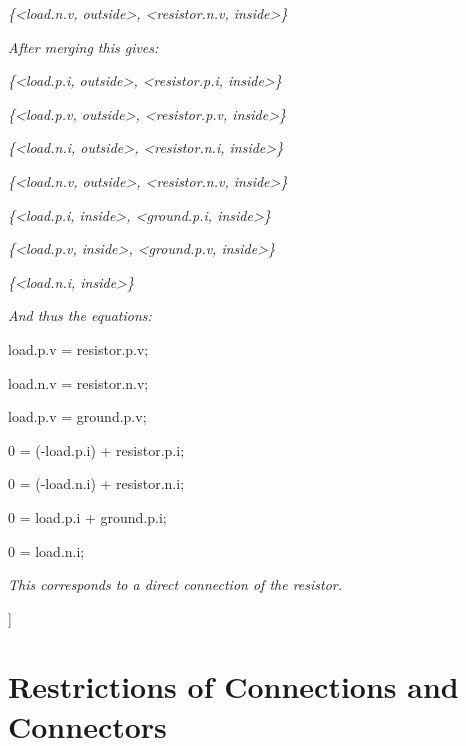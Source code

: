 \documentclass[10pt,a4paper]{report}
\def\doublelabel#1{\label{#1}}
\begin{document}
\emph{\{\textless{}load.n.v, outside\textgreater{},
\textless{}resistor.n.v, inside\textgreater{}\}}

\emph{After merging this gives:}

\emph{\{\textless{}load.p.i, outside\textgreater{},
\textless{}resistor.p.i, inside\textgreater{}\}}

\emph{\{\textless{}load.p.v, outside\textgreater{},
\textless{}resistor.p.v, inside\textgreater{}\}}

\emph{\{\textless{}load.n.i, outside\textgreater{},
\textless{}resistor.n.i, inside\textgreater{}\}}

\emph{\{\textless{}load.n.v, outside\textgreater{},
\textless{}resistor.n.v, inside\textgreater{}\}}

\emph{\{\textless{}load.p.i, inside\textgreater{},
\textless{}ground.p.i, inside\textgreater{}\}}

\emph{\{\textless{}load.p.v, inside\textgreater{},
\textless{}ground.p.v, inside\textgreater{}\}}

\emph{\{\textless{}load.n.i, inside\textgreater{}\}}

\emph{And thus the equations:}

load.p.v = resistor.p.v;

load.n.v = resistor.n.v;

load.p.v = ground.p.v;

0 = (-load.p.i) + resistor.p.i;

0 = (-load.n.i) + resistor.n.i;

0 = load.p.i + ground.p.i;

0 = load.n.i;

\emph{This corresponds to a direct connection of the resistor.}

{]}

\section{Restrictions of Connections and Connectors}\doublelabel{restrictions-of-connections-and-connectors}
\end{document}
